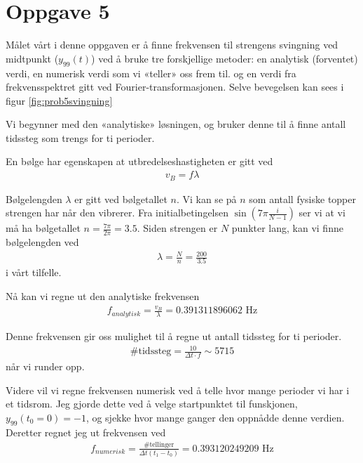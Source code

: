 \documentclass[norsk,a4,12pt,fleqn]{extarticle}
\begin{document}
\section*{Oppgave 5}
Målet vårt i denne oppgaven er 
å finne frekvensen
til strengens svingning
ved midtpunkt ($y_{99}(t)$)
ved å bruke tre 
forskjellige metoder:
en analytisk (forventet) verdi,
en numerisk verdi som vi
«teller» oss frem til.
og en verdi fra frekvensspektret
gitt ved Fourier-transformasjonen.
Selve bevegelsen kan sees i figur \ref{fig:prob5svingning}

Vi begynner med den «analytiske»
løsningen, og bruker denne
til å finne antall
tidssteg som trengs for ti perioder.

En bølge har egenskapen
at utbredelseshastigheten
er gitt ved
\begin{align}
    v_B = f\lambda
    \label{eq:vB2}
\end{align}

Bølgelengden $\lambda$
er gitt ved
bølgetallet $n$.
Vi kan se på $n$
som antall fysiske topper
strengen har når den vibrerer.
Fra initialbetingelsen
$\sin\left(7\pi \frac{i}{N-1} \right)$
ser vi at vi må ha
bølgetallet $n = \frac{7\pi}{2\pi} = 3.5$.
Siden strengen er $N$
punkter lang, kan vi finne
bølgelengden ved
\begin{align}
    \lambda = \frac{N}{n} =
    \frac{200}{3.5}
\end{align}
i vårt tilfelle.

Nå kan vi regne ut den analytiske
frekvensen
\begin{align}
    f_{analytisk} = \frac{v_B}{\lambda} = 0.391311896062 \text{ Hz}
\end{align}

Denne frekvensen gir oss mulighet
til å regne ut antall tidssteg
for ti perioder.
\begin{align}
    \text{\#tidssteg} =
    \frac{10}{\Delta t\cdot f}
    \sim 5715
\end{align}
når vi runder opp.

Videre vil vi regne frekvensen
numerisk  ved
å telle hvor mange perioder vi
har i et tidsrom.
Jeg gjorde dette ved å 
velge startpunktet til
funskjonen, $y_{99}(t_0 = 0) = -1$,
og sjekke hvor mange ganger
den oppnådde denne verdien.
Deretter regnet jeg ut frekvensen
ved 
\begin{align}
    f_{numerisk} = 
    \frac{\text{\#tellinger}}
    {\Delta t(t_1-t_0)}
    = 0.393120249209 \text{ Hz}
\end{align}
\end{document}
